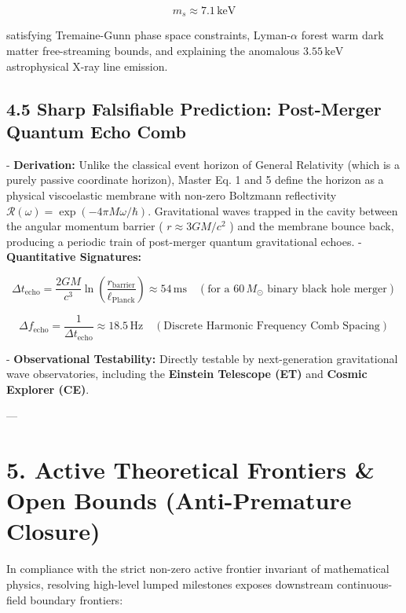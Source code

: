 \documentclass[11pt,a4paper]{article}
\theoremstyle{definition}
\theoremstyle{remark}
\begin{document}
\begin{equation}
m_s \approx 7.1 \, \mathrm{keV}
\end{equation}


satisfying Tremaine-Gunn phase space constraints, Lyman-$\alpha$ forest warm dark matter free-streaming bounds, and explaining the anomalous $3.55 \, \mathrm{keV}$ astrophysical X-ray line emission.

\subsection{4.5 Sharp Falsifiable Prediction: Post-Merger Quantum Echo Comb}
- \textbf{Derivation:} Unlike the classical event horizon of General Relativity (which is a purely passive coordinate horizon), Master Eq. 1 and 5 define the horizon as a physical viscoelastic membrane with non-zero Boltzmann reflectivity $\mathcal{R}(\omega) = \exp(-4\pi M \omega / \hbar)$. Gravitational waves trapped in the cavity between the angular momentum barrier ( $r \approx 3 G M/c^2$ ) and the membrane bounce back, producing a periodic train of post-merger quantum gravitational echoes.
- \textbf{Quantitative Signatures:}


\begin{equation}
\boxed{\Delta t_{\text{echo}} = \frac{2 G M}{c^3} \ln\left( \frac{r_{\text{barrier}}}{\ell_{\text{Planck}}} \right) \approx 54 \, \mathrm{ms} \quad (\text{for a } 60 \, M_\odot \text{ binary black hole merger})}
\end{equation}



\begin{equation}
\boxed{\Delta f_{\text{echo}} = \frac{1}{\Delta t_{\text{echo}}} \approx 18.5 \, \mathrm{Hz} \quad (\text{Discrete Harmonic Frequency Comb Spacing})}
\end{equation}


- \textbf{Observational Testability:} Directly testable by next-generation gravitational wave observatories, including the \textbf{Einstein Telescope (ET)} and \textbf{Cosmic Explorer (CE)}.

---

\section{5. Active Theoretical Frontiers \& Open Bounds (Anti-Premature Closure)}

In compliance with the strict non-zero active frontier invariant of mathematical physics, resolving high-level lumped milestones exposes downstream continuous-field boundary frontiers:
\end{document}
